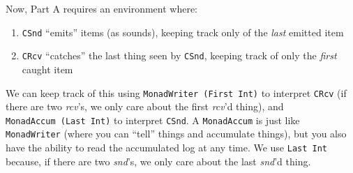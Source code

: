 \documentclass[]{article}
\newenvironment{Shaded}{}{}
\newcommand{\CommentTok}[1]{\textcolor[rgb]{0.38,0.63,0.69}{\textit{#1}}}
\newcommand{\DataTypeTok}[1]{\textcolor[rgb]{0.56,0.13,0.00}{#1}}
\newcommand{\DecValTok}[1]{\textcolor[rgb]{0.25,0.63,0.44}{#1}}
\newcommand{\FunctionTok}[1]{\textcolor[rgb]{0.02,0.16,0.49}{#1}}
\newcommand{\KeywordTok}[1]{\textcolor[rgb]{0.00,0.44,0.13}{\textbf{#1}}}
\newcommand{\NormalTok}[1]{#1}
\newcommand{\OperatorTok}[1]{\textcolor[rgb]{0.40,0.40,0.40}{#1}}
\newcommand{\OtherTok}[1]{\textcolor[rgb]{0.00,0.44,0.13}{#1}}
\begin{document}
Now, Part A requires an environment where:

\begin{enumerate}
\def\labelenumi{\arabic{enumi}.}
\tightlist
\item
  \texttt{CSnd} ``emits'' items (as sounds), keeping track only of the
  \emph{last} emitted item
\item
  \texttt{CRcv} ``catches'' the last thing seen by \texttt{CSnd}, keeping track
  of only the \emph{first} caught item
\end{enumerate}

We can keep track of this using \texttt{MonadWriter\ (First\ Int)} to interpret
\texttt{CRcv} (if there are two \emph{rcv}'s, we only care about the first
\emph{rcv}'d thing), and \texttt{MonadAccum\ (Last\ Int)} to interpret
\texttt{CSnd}. A \texttt{MonadAccum} is just like \texttt{MonadWriter} (where
you can ``tell'' things and accumulate things), but you also have the ability to
read the accumulated log at any time. We use \texttt{Last\ Int} because, if
there are two \emph{snd}'s, we only care about the last \emph{snd}'d thing.

\begin{Shaded}
\end{Shaded}
\end{document}
